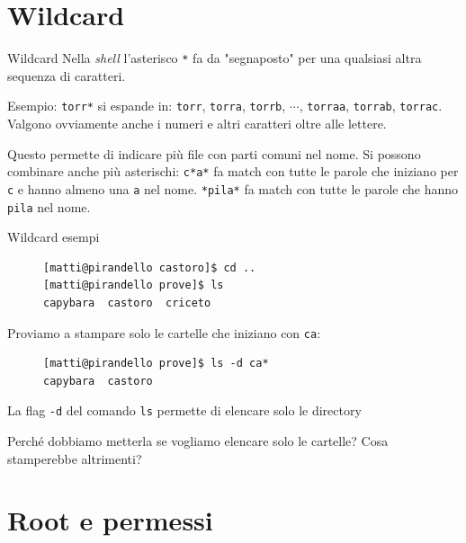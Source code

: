 \documentclass{beamer}
\begin{document}
\section{Wildcard}
\begin{frame}{Wildcard}
  Nella \textit{shell} l'asterisco \texttt{*} fa da "segnaposto" per una 
  qualsiasi altra sequenza di caratteri.\bigskip

  Esempio: \texttt{torr*} si espande in: \texttt{torr}, \texttt{torra}, 
  \texttt{torrb}, $\cdots$, \texttt{torraa}, \texttt{torrab}, \texttt{torrac}. 
  Valgono ovviamente anche i numeri e altri caratteri oltre alle lettere.\bigskip

  Questo permette di indicare più file con parti comuni nel nome. Si possono
  combinare anche più asterischi: \texttt{c*a*} fa match con tutte le
  parole che iniziano per \texttt{c} e hanno almeno una \texttt{a} nel 
  nome. \texttt{*pila*} fa match con tutte le parole che hanno \texttt{pila} nel 
  nome.\bigskip
\end{frame}

\begin{frame}[fragile]{Wildcard esempi}
  \begin{figure}
    \begin{lstlisting}[basicstyle=\footnotesize]
[matti@pirandello castoro]$ cd ..
[matti@pirandello prove]$ ls
capybara  castoro  criceto
    \end{lstlisting}
  \end{figure}

  Proviamo a stampare solo le cartelle che iniziano con \texttt{ca}: 
  
  \begin{figure}
    \begin{lstlisting}[basicstyle=\footnotesize]
[matti@pirandello prove]$ ls -d ca*
capybara  castoro
    \end{lstlisting}
  \end{figure}

  La flag \texttt{-d} del comando \texttt{ls} permette di elencare solo le
  directory \bigskip

  Perché dobbiamo metterla se vogliamo elencare solo le cartelle? Cosa
  stamperebbe altrimenti?

\end{frame}

\section{Root e permessi}
\end{document}
